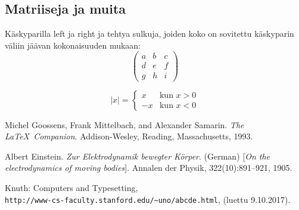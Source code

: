 \documentclass[12pt, titlepage]{article}
\theoremstyle{definition}
\newcommand{\abs}[1]{\vert #1 \vert} %
\begin{document}
\subsection{Matriiseja ja muita}
Käskyparilla left ja right ja tehtya sulkuja, joiden koko on sovitettu käskyparin väliin jäävan kokonaisuuden mukaan:
\[
\left(
\begin{array}{ccc}
a & b & c \\
d & e & f \\
g & h & i
\end{array}
\right)
\]

\[
\abs{x} =
\left\{
\begin{array}{rl}
x & \text{kun } x >0 \\
-x & \text{kun } x <0
\end{array}
\right.
\]



\renewcommand{\refname}{Kirjallisuutta} %


\begin{thebibliography}{9}
Michel Goossens, Frank Mittelbach, and Alexander Samarin.
\textit{The \LaTeX\ Companion}.
Addison-Wesley, Reading, Massachusetts, 1993.

Albert Einstein.
\textit{Zur Elektrodynamik bewegter K{\"o}rper}. (German)
[\textit{On the electrodynamics of moving bodies}].
Annalen der Physik, 322(10):891–921, 1905.

Knuth: Computers and Typesetting,
\\\texttt{http://www-cs-faculty.stanford.edu/\~{}uno/abcde.html}, (luettu 9.10.2017).
\end{thebibliography}




% 



\end{document}
